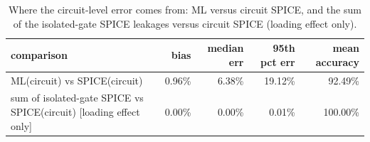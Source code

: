 \begin{table}[H]
\centering
{\small
\begin{tabular}{lrrrr}
\toprule
comparison & bias & median err & 95th pct err & mean accuracy \\
\midrule
ML(circuit) vs SPICE(circuit) & 0.96\% & 6.38\% & 19.12\% & 92.49\% \\
sum of isolated-gate SPICE vs SPICE(circuit) [loading effect only] & 0.00\% & 0.00\% & 0.01\% & 100.00\% \\
\bottomrule
\end{tabular}
}
\caption{Where the circuit-level error comes from: ML versus circuit SPICE, and the sum of the isolated-gate SPICE leakages versus circuit SPICE (loading effect only).}
\label{tab:cdecomp}
\end{table}

